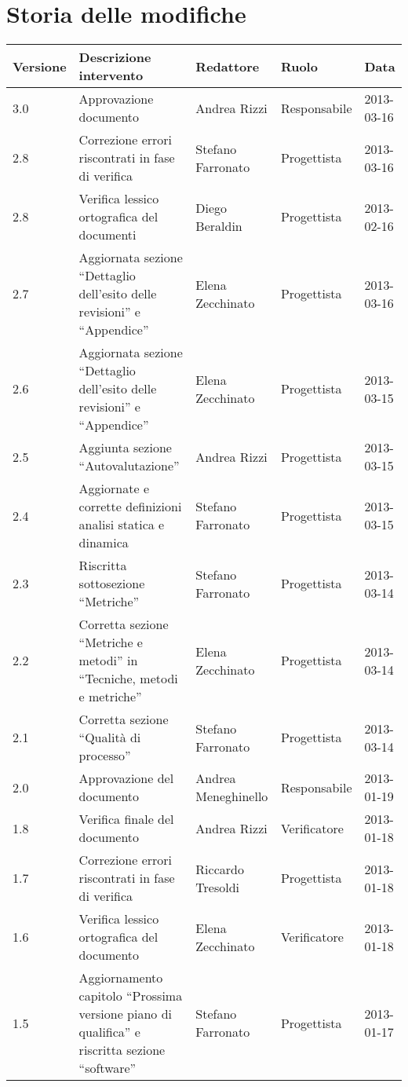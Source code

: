 \section*{Storia delle modifiche}
\begin{longtable}{lp{}lll}
\toprule
Versione & Descrizione intervento & Redattore & Ruolo & Data\\
\midrule %

3.0 & Approvazione documento& Andrea Rizzi &Responsabile & 2013-03-16\\
2.8 & Correzione errori riscontrati in fase di verifica& Stefano Farronato &Progettista & 2013-03-16\\
2.8 & Verifica lessico ortografica del documenti& Diego Beraldin &Progettista & 2013-02-16\\
2.7 & Aggiornata sezione ``Dettaglio dell'esito delle revisioni'' e ``Appendice'' & Elena Zecchinato &Progettista & 2013-03-16\\
2.6 & Aggiornata sezione ``Dettaglio dell'esito delle revisioni'' e ``Appendice'' & Elena Zecchinato &Progettista & 2013-03-15\\
2.5 & Aggiunta sezione ``Autovalutazione'' & Andrea Rizzi &Progettista & 2013-03-15\\
2.4 & Aggiornate e corrette definizioni analisi statica e dinamica & Stefano Farronato &Progettista  & 2013-03-15\\
2.3 & Riscritta sottosezione ``Metriche''  & Stefano Farronato &Progettista  & 2013-03-14\\
2.2 & Corretta sezione ``Metriche e metodi'' in ``Tecniche, metodi e metriche'' & Elena Zecchinato &Progettista & 2013-03-14\\
2.1 & Corretta sezione ``Qualità di processo'' & Stefano Farronato &Progettista & 2013-03-14\\
2.0 & Approvazione del documento& Andrea Meneghinello &Responsabile & 2013-01-19\\
1.8 & Verifica finale del documento& Andrea Rizzi &Verificatore & 2013-01-18\\
1.7 & Correzione errori riscontrati in fase di verifica& Riccardo Tresoldi &Progettista & 2013-01-18\\
1.6 & Verifica lessico ortografica del documento& Elena Zecchinato &Verificatore & 2013-01-18\\
1.5 & Aggiornamento capitolo ``Prossima versione piano di qualifica'' e riscritta sezione ``software''& Stefano Farronato &Progettista & 2013-01-17\\

\end{longtable}
